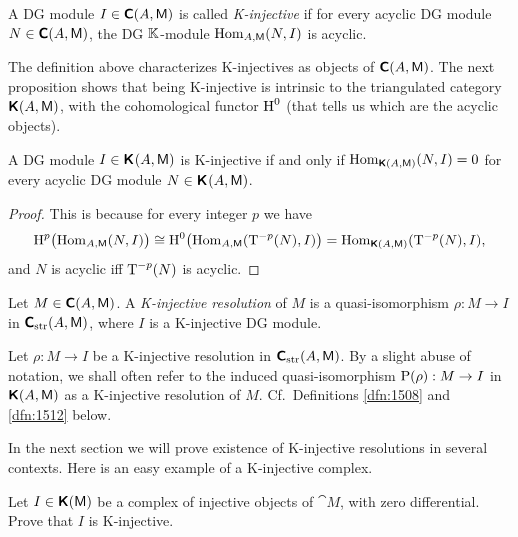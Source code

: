 \begin{dfn} \label{dfn:1506}
A DG module $I \in \boldsymbol{\mathsf{C}}(A, \operatorname{\mathsf{M}})$ is called 
{\em K-injective}%
if for every acyclic DG module $N \in \boldsymbol{\mathsf{C}}(A, \operatorname{\mathsf{M}})$, the DG $\mathbb{K}$-module 
$\operatorname{Hom}_{A, \operatorname{\mathsf{M}}}(N, I)$ is acyclic.
\end{dfn}

The definition above characterizes K-injectives as objects of 
$\boldsymbol{\mathsf{C}}(A, \operatorname{\mathsf{M}})$. 
The next proposition shows that being K-injective is intrinsic to the 
triangulated category $\boldsymbol{\mathsf{K}}(A, \operatorname{\mathsf{M}})$, with the cohomological functor 
$\operatorname{H}^0$ (that tells us which are the acyclic objects). 

\begin{prop} \label{prop:1515}
A DG module $I \in \boldsymbol{\mathsf{K}}^{}(A, \operatorname{\mathsf{M}})$ is K-injective if and only if 
$\operatorname{Hom}_{\boldsymbol{\mathsf{K}}(A, \operatorname{\mathsf{M}})}(N, I) = 0$ for every acyclic DG module 
$N \in \boldsymbol{\mathsf{K}}^{}(A, \operatorname{\mathsf{M}})$.
\end{prop}

\begin{proof}
This is because for every integer $p$ we have 
\[ \operatorname{H}^p \bigl( \operatorname{Hom}_{A, \operatorname{\mathsf{M}}}(N, I) \bigr) \cong
\operatorname{H}^0 \bigl( \operatorname{Hom}_{A, \operatorname{\mathsf{M}}}(\operatorname{T}^{-p}(N), I) \bigr) 
= \operatorname{Hom}_{\boldsymbol{\mathsf{K}}(A, \operatorname{\mathsf{M}})}(\operatorname{T}^{-p}(N), I) , \]
and $N$ is acyclic iff $\operatorname{T}^{-p}(N)$ is acyclic.
\end{proof}

\begin{dfn} \label{dfn:1507}
Let $M \in \boldsymbol{\mathsf{C}}(A, \operatorname{\mathsf{M}})$. A 
{\em K-injective resolution}%
of $M$ is a quasi-isomorphism $\rho : M \to I$ in 
$\boldsymbol{\mathsf{C}}_{\mathrm{str}}(A, \operatorname{\mathsf{M}})$, where 
$I$ is a K-injective DG module. 
\end{dfn}

\begin{rem} \label{rem:5051}
Let $\rho : M \to I$ be a K-injective resolution in 
$\boldsymbol{\mathsf{C}}_{\mathrm{str}}(A, \operatorname{\mathsf{M}})$. 
By a slight abuse of notation, we shall often refer to the induced 
quasi-isomorphism 
$\operatorname{P}(\rho) : M \to I$ in $\boldsymbol{\mathsf{K}}(A, \operatorname{\mathsf{M}})$
as a K-injective resolution of $M$. Cf.\ Definitions \ref{dfn:1508} and
\ref{dfn:1512} below. 
\end{rem}

In the next section we will prove existence of K-injective resolutions in 
several contexts. Here is an easy example of a K-injective complex. 

\begin{exer} \label{exer:1505}
Let $I \in \boldsymbol{\mathsf{K}}(\operatorname{\mathsf{M}})$ be a complex of injective objects of 
$\cat{M}$, with zero differential. Prove that $I$ is K-injective. 
\end{exer}

